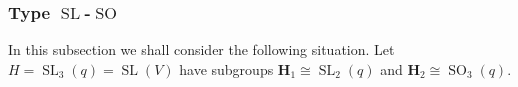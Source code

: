 \documentclass[12pt]{amsart}
\newtheorem{lemma}[theorem]{Lemma}
\theoremstyle{definition}
\newcommand{\bpf}{\noindent{\bf Proof}\hspace{7pt}}
\newcommand{\epf}{\qed}
\newcommand{\ble}{\begin{lemma}}
\newcommand{\ele}{\end{lemma}}
\DeclareMathOperator{\SL}{SL}
\DeclareMathOperator{\SO}{SO}
\renewcommand{\qed}{\hfill $\square$}
\newcommand{\amgrpH}{{\mathbf{H}}}
\begin{document}
%

\subsubsection{Type $\SL$-$\SO$}\label{subsub:SLSO}
In this subsection we shall consider the following situation.
Let $H=\SL_3(q)=\SL(V)$ have subgroups $\amgrpH_1\cong \SL_2(q)$ and $\amgrpH_2\cong\SO_3(q)$.
\end{document}
